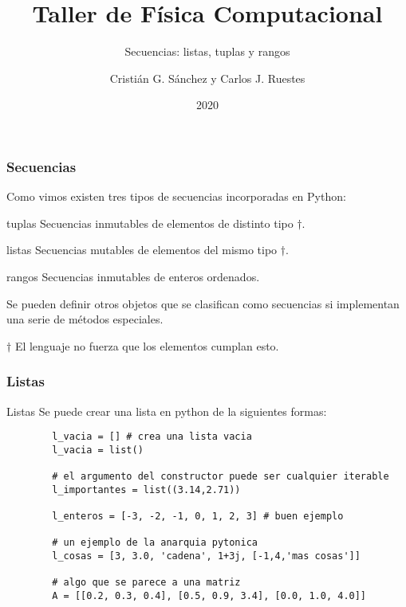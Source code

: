 \documentclass{beamer}
\title{Taller de Física Computacional}
\subtitle{Secuencias: listas, tuplas y rangos}
\author{Cristián G. Sánchez y Carlos J. Ruestes}
\date{2020}
\begin{document}
\frame{\titlepage}


\begin{frame}[fragile]
    \frametitle{Secuencias}
    Como vimos existen tres tipos de secuencias incorporadas en Python:
    \begin{block}{tuplas}
        Secuencias inmutables de elementos de distinto tipo $\dagger$.
    \end{block}
    \begin{block}{listas}
        Secuencias mutables de elementos del mismo tipo $\dagger$.
    \end{block}
    \begin{block}{rangos}
        Secuencias inmutables de enteros ordenados.
    \end{block}
    Se pueden definir otros objetos que se clasifican como secuencias si implementan una serie de métodos especiales.

    $\dagger$ El lenguaje no fuerza que los elementos cumplan esto.

\end{frame}


\begin{frame}[fragile]
    \frametitle{Listas}
    \begin{block}{Listas}
    Se puede crear una lista en python de la siguientes formas:
        \begin{verbatim}
        l_vacia = [] # crea una lista vacia
        l_vacia = list()

        # el argumento del constructor puede ser cualquier iterable
        l_importantes = list((3.14,2.71))

        l_enteros = [-3, -2, -1, 0, 1, 2, 3] # buen ejemplo

        # un ejemplo de la anarquia pytonica
        l_cosas = [3, 3.0, 'cadena', 1+3j, [-1,4,'mas cosas']]

        # algo que se parece a una matriz
        A = [[0.2, 0.3, 0.4], [0.5, 0.9, 3.4], [0.0, 1.0, 4.0]]
        \end{verbatim}
    \end{block}
    \end{frame}
    
\end{document}
